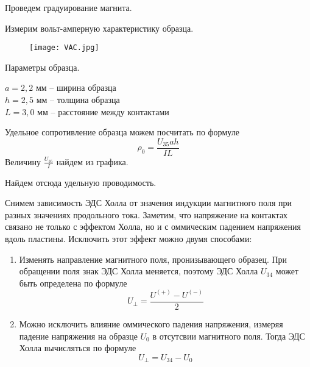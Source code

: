 



    \noindent Проведем градуирование магнита.
    

    \noindent Измерим вольт-амперную характеристику образца.
    
    
    \begin{figure}[h!]
        \centering
        \texttt{[image: VAC.jpg]}
        \caption{}
    \end{figure}

    \noindent Параметры образца.
    \begin{center}
        $a = 2,2$ мм -- ширина образца              \\
        $h = 2,5$ мм -- толщина образца             \\
        $L = 3,0$ мм -- расстояние между контактами \\
    \end{center}

    \noindent Удельное сопротивление образца можем посчитать по формуле
    \begin{equation*}
        \rho_0 = \frac{U_{35} a h}{I L}
    \end{equation*}
    \noindent Величину $\frac{U_{35}}{I}$ найдем из графика.

    \begin{center}
    \end{center}

    \noindent Найдем отсюда удельную проводимость.

    \begin{center}
    \end{center}

    \noindent Снимем зависимость ЭДС Холла от значения индукции магнитного поля при разных значениях продольного тока.
    Заметим, что напряжение на контактах связано не только с эффектом Холла, но и с 
    оммическим падением напряжения вдоль пластины. Исключить этот эффект можно двумя способами:

    \begin{enumerate}
        \item Изменять направление магнитного поля, пронизывающего образец. При обращении поля знак
        ЭДС Холла меняется, поэтому ЭДС Холла $U_{34}$ может быть определена по формуле
        \begin{equation*}
            U_{\bot} = \frac{U^{(+)} - U^{(-)}}{2}
        \end{equation*}
        \item Можно исключить влияние оммического падения напряжения, измеряя падение напряжения на образце $U_0$
        в отсутсвии магнитного поля. Тогда ЭДС Холла вычисляться по формуле
        \begin{equation*}
            U_{\bot} = U_{34} - U_0
        \end{equation*}
    \end{enumerate}

